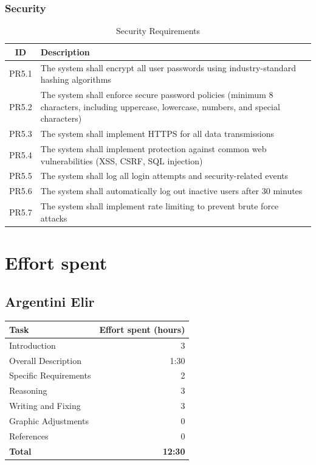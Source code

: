 \documentclass{article}
\begin{document}
\subsubsection{Security}
\begin{table}[h!]
    \centering
    \begin{tabular}{|c|p{10cm}|}
    \hline
    \textbf{ID} & \textbf{Description} \\
    \hline
    PR5.1 & The system shall encrypt all user passwords using industry-standard hashing algorithms \\
    PR5.2 & The system shall enforce secure password policies (minimum 8 characters, including uppercase, lowercase, numbers, and special characters) \\
    PR5.3 & The system shall implement HTTPS for all data transmissions \\
    PR5.4 & The system shall implement protection against common web vulnerabilities (XSS, CSRF, SQL injection) \\
    PR5.5 & The system shall log all login attempts and security-related events \\
    PR5.6 & The system shall automatically log out inactive users after 30 minutes \\
    PR5.7 & The system shall implement rate limiting to prevent brute force attacks \\
    \hline
    \end{tabular}
    \caption{Security Requirements}
    \label{tab}
\end{table}


\clearpage
\section{Effort spent}


\subsection{Argentini Elir}
\begin{center}
    \begin{tabular}{|l|r|}
    \hline
    \textbf{Task} & \textbf{Effort spent (hours)} \\
    \hline
    Introduction & 3 \\
    Overall Description & 1:30 \\
    Specific Requirements & 2 \\
    Reasoning & 3 \\
    Writing and Fixing & 3 \\
    Graphic Adjustments & 0 \\
    References & 0\\
    \hline
    \textbf{Total} & \textbf{12:30} \\
    \hline
    \end{tabular}
\end{center}
\end{document}
